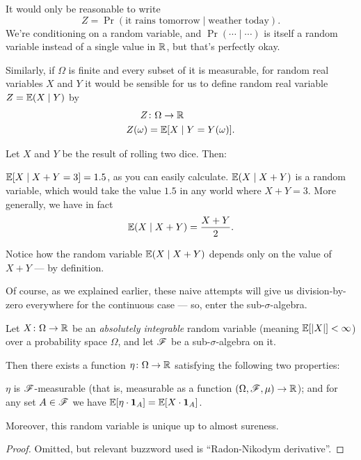 It would only be reasonable to write
\[ Z = \Pr(\text{it rains tomorrow}\mid \text{weather today}). \]
We're conditioning on a random variable, and $\Pr(\cdots \mid \cdots)$ is itself a random variable
instead of a single value in $\mathbb R$, but that's perfectly okay.

Similarly, if $\Omega$ is finite and every subset of it is measurable,
for random real variables $X$ and $Y$
it would be sensible for us to define random real variable $Z = \mathbb E(X \mid Y)$ by
\begin{align*}
	Z &\colon \Omega \to \mathbb R \\
	Z(\omega) &= \mathbb E[X \mid Y = Y(\omega)].
\end{align*}

\begin{example}
	Let $X$ and $Y$ be the result of rolling two dice. Then:
	\begin{itemize}
		\ii $\mathbb E[X \mid X+Y = 3] = 1.5$, as you can easily calculate.
		\ii $\mathbb E(X \mid X+Y)$ is a random variable, which would take the value
		$1.5$ in any world where $X+Y = 3$.
		\ii More generally, we have in fact
		\[ \mathbb E(X \mid X+Y) = \frac{X+Y}{2}. \]
	\end{itemize}
	Notice how the random variable $\mathbb E(X \mid X+Y)$ depends only on the value of $X+Y$ --- by
	definition.
\end{example}

Of course, as we explained earlier, these naive attempts will give us division-by-zero
everywhere for the continuous case --- so, enter the sub-$\sigma$-algebra.

\begin{proposition}
	\label{prop:conditional_exp}
	Let $X \colon \Omega \to \mathbb R$ be an \emph{absolutely integrable}
	random variable (meaning $\mathbb E[|X|] < \infty$)
	over a probability space $\Omega$,
	and let $\mathscr F$ be a sub-$\sigma$-algebra on it.

	Then there exists a function $\eta \colon \Omega \to \mathbb R$
	satisfying the following two properties:
	\begin{itemize}
		\ii $\eta$ is $\mathscr F$-measurable (that is,
			measurable as a function $(\Omega, \mathscr F, \mu) \to \mathbb R$); and
		\ii for any set $A \in \mathscr F$ we have
		$\mathbb E[\eta \cdot \mathbf{1}_A] = \mathbb E[X \cdot \mathbf{1}_A]$.
	\end{itemize}
	Moreover, this random variable is unique up to almost sureness.
\end{proposition}
\begin{proof}
	Omitted, but relevant buzzword used is ``Radon-Nikodym derivative''.
\end{proof}

